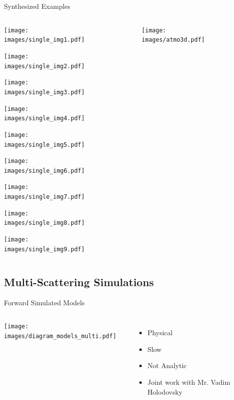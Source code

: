 \documentclass[compress,red,12pt]{beamer}
\begin{document}

\begin{frame}{Synthesized Examples}
  \begin{columns}[C]
    \begin{column}{.7\textwidth}
      \begin{overlayarea}{\columnwidth}{8cm}
        {\centerline{\texttt{[image: images/single\_img1.pdf]}}}
        {\centerline{\texttt{[image: images/single\_img2.pdf]}}}
        {\centerline{\texttt{[image: images/single\_img3.pdf]}}}
        {\centerline{\texttt{[image: images/single\_img4.pdf]}}}
        {\centerline{\texttt{[image: images/single\_img5.pdf]}}}
        {\centerline{\texttt{[image: images/single\_img6.pdf]}}}
        {\centerline{\texttt{[image: images/single\_img7.pdf]}}}
        {\centerline{\texttt{[image: images/single\_img8.pdf]}}}
        {\centerline{\texttt{[image: images/single\_img9.pdf]}}}
      \end{overlayarea}
    \end{column}
    \begin{column}{.3\textwidth}
      \begin{figure}
        \centering
        \texttt{[image: images/atmo3d.pdf]}
      \end{figure}
    \end{column}
  \end{columns}
\end{frame}


\subsection{Multi-Scattering Simulations}

\begin{frame}{Forward Simulated Models}
  \begin{columns}[C]
    \texttt{[image: images/diagram\_models\_multi.pdf]}

    \begin{itemize}
    \item Physical
    \item Slow
    \item Not Analytic
    \item Joint work with Mr. Vadim Holodovsky
    \end{itemize}
  \end{columns}
\end{frame}
\end{document}
